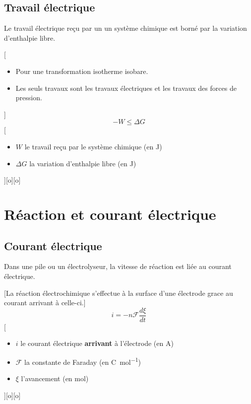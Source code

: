 \subsection{Travail électrique}

Le travail électrique reçu par un un système chimique est borné par la variation d'enthalpie libre.

[
    \begin{itemize}
        \item Pour une transformation isotherme isobare.
        \item Les seuls travaux sont les travaux électriques et les travaux des forces de pression.
    \end{itemize}
]
{$$-W\leq\Delta G$$}
[
    \begin{itemize}
        \item $W$ le travail reçu par le système chimique (en \unit{J})
        \item $\Delta G$ la variation d'enthalpie libre (en \unit{J})
    \end{itemize}
][o][o]




\section{Réaction et courant électrique}
\subsection{Courant électrique}
Dans une pile ou un électrolyseur, la vitesse de réaction est liée au courant électrique.

[La réaction électrochimique s'effectue à la surface d'une électrode grace au courant arrivant à celle-ci.]
{$$i=-n\mathcal{F}\frac{d\xi}{dt}$$}
[
    \begin{itemize}
        \item $i$ le courant électrique \textbf{arrivant} à l'électrode (en \unit{A})
        \item $\mathcal{F}$ la constante de Faraday (en \unit{C.mol^{-1}})
        \item $\xi$ l'avancement (en \unit{mol})
    \end{itemize}
][o][o]


